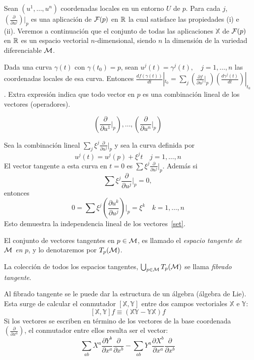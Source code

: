 Sean $(u^1 , \ldots  , u^n)$ coordenadas locales en un entorno  $U$ de $p$. Para
cada $j$, $\left( \frac{\partial}{\partial  u^j} \right)|_p$ es una aplicaci\'on
de $\mathcal{F}(p)$  en $\mathbb{R}$ la cual satisface  las propiedades (i) e  (ii). Veremos a
continuaci\'on que el conjunto de todas las aplicaciones $\mathbb{X}$ de $\mathcal{F}(p)$
en $\mathbb{R}$ es un espacio vectorial $n$-dimensional, siendo $n$ la dimensi\'on de
la variedad diferenciable $\mathcal{M}$.

Dada una  curva $\gamma(t)$ con $\gamma(t_0)  = p$, sean  $u^j(t) = \gamma^j(t),
\quad  j =  1 ,  \ldots ,  n$  las coordenadas  locales de  esa curva.  Entonces
$\frac{df(\gamma(t))}{dt}|_{t_0}  =  \sum_j  \left(  \frac{\partial  f}{\partial
    u^j}|_p  \right)  \left( \frac{d  \gamma^j  (t)}{dt} \right)|_{t_0}$.  Extra %
expresi\'on indica  que todo vector  en $p$ es  una combinaci\'on lineal  de los
vectores (operadores).

\begin{equation}
\left(\frac{\partial}{\partial u^1}|_p \right),\ldots,\left(\frac{\partial}{\partial u^n}|_p \right) \label{set}
\end{equation}

Sea la  combinaci\'on lineal  $\sum_j \xi^j \frac{\partial}{\partial  u^j}|_p$ y
sea la curva definida por
%
\[
u^j(t) = u^j(p) + \xi^j t \quad j = 1 , \ldots , n
\]
%
El   vector   tangente   a   esta   curva   en  $t   =   0$   es   $\sum   \xi^j
\frac{\partial}{\partial u^j}|_p$.  Adem\'as si
%
\[
\sum \xi^j \frac{\partial}{\partial u^j}|_p =0,
\]
%
entonces
%
\[
0 = \sum \xi^j \left( \frac{\partial u^k}{\partial u^j} \right)|_p = \xi^k \quad
k = 1 , \ldots , n
\]
%
Esto demuestra la independencia lineal de los vectores~\eqref{set}.
%
\begin{definicion}
  El conjunto  de vectores tangentes en $p  \in \mathcal{M}$, es llamado  el {\it espacio
    tangente de $\mathcal{M}$ en $p$}, y lo denotaremos por $T_p(\mathcal{M})$.
\end{definicion}

La colecci\'on de todos los  espacios tangentes, $\bigcup_{p \in \mathcal{M}} T_p(\mathcal{M})$ se
llama {\it fibrado tangente}.

Al fibrado tangente se le puede  dar la estructura de un \'algebra (\'algebra de
Lie). Esta surge de calcular  el conmutador $[\mathbb{X}, \mathbb{Y}]$ entre dos
campos vectoriales $\mathbb{X}$ e $\mathbb{Y}$:
%
\[
[\mathbb{X},  \mathbb{Y}] f  \equiv  \left( \mathbb{X}  \mathbb{Y} -  \mathbb{Y}
  \mathbb{X} \right) f
\]
%
Si los vectores  se escriben en t\'ermino de los vectores  de la base coordenada
$\left(  \frac{\partial}{\partial  x^a}  \right)$,  el  conmutador  entre  ellos
resulta ser el vector:
%
\[
\sum_{ab} X^a \frac{\partial  Y^b}{\partial x^a} \frac{\partial}{\partial x^b} -
\sum_{ab} Y^a \frac{\partial X^b}{\partial x^a} \frac{\partial}{\partial x^b}
\]

